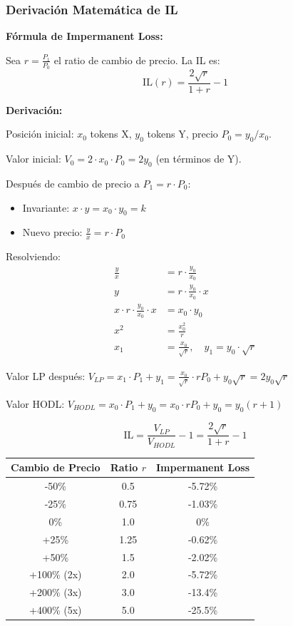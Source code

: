 \documentclass[11pt,a4paper,twoside]{book}
\begin{document}
\subsubsection{Derivaci\'on Matem\'atica de IL}

\begin{mathnote}
\textbf{F\'ormula de Impermanent Loss:}

Sea $r = \frac{P_1}{P_0}$ el ratio de cambio de precio. La IL es:
\[
\text{IL}(r) = \frac{2\sqrt{r}}{1 + r} - 1
\]

\textbf{Derivaci\'on:}

Posici\'on inicial: $x_0$ tokens X, $y_0$ tokens Y, precio $P_0 = y_0/x_0$.

Valor inicial: $V_0 = 2 \cdot x_0 \cdot P_0 = 2y_0$ (en t\'erminos de Y).

Despu\'es de cambio de precio a $P_1 = r \cdot P_0$:
\begin{itemize}
    \item Invariante: $x \cdot y = x_0 \cdot y_0 = k$
    \item Nuevo precio: $\frac{y}{x} = r \cdot P_0$
\end{itemize}

Resolviendo:
\begin{align}
\frac{y}{x} &= r \cdot \frac{y_0}{x_0} \\
y &= r \cdot \frac{y_0}{x_0} \cdot x \\
x \cdot r \cdot \frac{y_0}{x_0} \cdot x &= x_0 \cdot y_0 \\
x^2 &= \frac{x_0^2}{r} \\
x_1 &= \frac{x_0}{\sqrt{r}}, \quad y_1 = y_0 \cdot \sqrt{r}
\end{align}

Valor LP despu\'es: $V_{LP} = x_1 \cdot P_1 + y_1 = \frac{x_0}{\sqrt{r}} \cdot r P_0 + y_0\sqrt{r} = 2y_0\sqrt{r}$

Valor HODL: $V_{HODL} = x_0 \cdot P_1 + y_0 = x_0 \cdot r P_0 + y_0 = y_0(r + 1)$

\[
\text{IL} = \frac{V_{LP}}{V_{HODL}} - 1 = \frac{2\sqrt{r}}{1 + r} - 1
\]
\end{mathnote}

\begin{center}
\begin{tabular}{ccc}
\toprule
Cambio de Precio & Ratio $r$ & Impermanent Loss \\
\midrule
-50\% & 0.5 & -5.72\% \\
-25\% & 0.75 & -1.03\% \\
0\% & 1.0 & 0\% \\
+25\% & 1.25 & -0.62\% \\
+50\% & 1.5 & -2.02\% \\
+100\% (2x) & 2.0 & -5.72\% \\
+200\% (3x) & 3.0 & -13.4\% \\
+400\% (5x) & 5.0 & -25.5\% \\
\bottomrule
\end{tabular}
\end{center}
\end{document}
